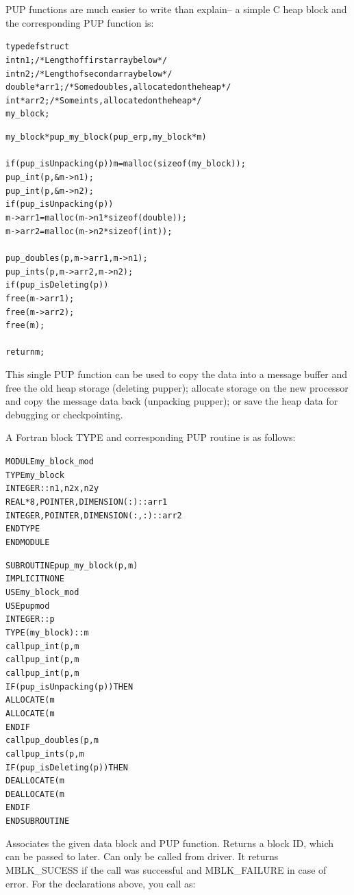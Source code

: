 \documentclass[10pt]{article}
\begin{document}
PUP functions are much easier to write than explain-- a simple C heap block
and the corresponding PUP function is:

\begin{alltt}
     typedef struct {
       int n1;/*Length of first array below*/
       int n2;/*Length of second array below*/
       double *arr1; /*Some doubles, allocated on the heap*/
       int *arr2; /*Some ints, allocated on the heap*/
     } my_block;
 
     my_block *pup_my_block(pup_er p,my_block *m)
     {
       if (pup_isUnpacking(p)) m=malloc(sizeof(my_block));
       pup_int(p,\&m->n1);
       pup_int(p,\&m->n2);
       if (pup_isUnpacking(p)) {
         m->arr1=malloc(m->n1*sizeof(double));
         m->arr2=malloc(m->n2*sizeof(int));
       }
       pup_doubles(p,m->arr1,m->n1);
       pup_ints(p,m->arr2,m->n2);
       if (pup_isDeleting(p)) {
         free(m->arr1);
         free(m->arr2);
         free(m);
       }
       return m;
     }
\end{alltt}

This single PUP function can be used to copy the  data into a
message buffer and free the old heap storage (deleting pupper); allocate
storage on the new processor and copy the message data back (unpacking pupper);
or save the heap data for debugging or checkpointing.

A Fortran block TYPE and corresponding PUP routine is as follows:

\begin{alltt}
     MODULE my_block_mod
       TYPE my_block
         INTEGER :: n1,n2x,n2y
         REAL*8, POINTER, DIMENSION(:) :: arr1
         INTEGER, POINTER, DIMENSION(:,:) :: arr2
       END TYPE
     END MODULE
 
     SUBROUTINE pup_my_block(p,m)
       IMPLICIT NONE
       USE my_block_mod
       USE pupmod
       INTEGER :: p
       TYPE(my_block) :: m
       call pup_int(p,m%
       call pup_int(p,m%
       call pup_int(p,m%
       IF (pup_isUnpacking(p)) THEN
         ALLOCATE(m%
         ALLOCATE(m%
       END IF
       call pup_doubles(p,m%
       call pup_ints(p,m%
       IF (pup_isDeleting(p)) THEN
         DEALLOCATE(m%
         DEALLOCATE(m%
       END IF
     END SUBROUTINE
\end{alltt}

     Associates the given data block and PUP function.  Returns a block
     ID, which can be passed to  later.  Can only be
     called from driver.  It returns MBLK\_SUCESS if the call was successful
     and MBLK\_FAILURE in case of error. For the declarations above, you call
      as:
\end{document}
